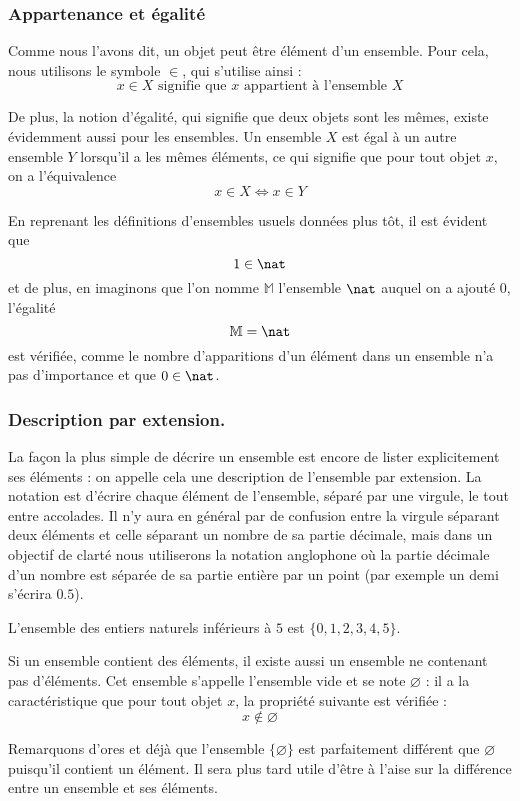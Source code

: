 \subsubsection{Appartenance et égalité}

Comme nous l'avons dit, un objet peut être élément d'un ensemble. Pour cela, nous utilisons le symbole $\in$, qui s'utilise ainsi :
$$x\in X \text{ signifie que } x \text{ appartient à l'ensemble } X
$$

De plus, la notion d'égalité, qui signifie que deux objets sont les mêmes, existe évidemment aussi pour les ensembles. Un ensemble $X$ est égal à un autre ensemble $Y$ lorsqu'il a les mêmes éléments, ce qui signifie que pour tout objet $x$, on a l'équivalence $$x\in X \iff x\in Y$$

\begin{expl}
    En reprenant les définitions d'ensembles usuels données plus tôt, il est évident que $$1\in\nat$$ et de plus, en imaginons que l'on nomme $\mathbb M$ l'ensemble $\nat$ auquel on a ajouté $0$, l'égalité $$\mathbb M = \nat$$ est vérifiée, comme le nombre d'apparitions d'un élément dans un ensemble n'a pas d'importance et que $0\in \nat$.
\end{expl}

\subsubsection{Description par extension.}

La façon la plus simple de décrire un ensemble est encore de lister explicitement ses éléments : on appelle cela une description de l'ensemble par extension. La notation est d'écrire chaque élément de l'ensemble, séparé par une virgule, le tout entre accolades. Il n'y aura en général par de confusion entre la virgule séparant deux éléments et celle séparant un nombre de sa partie décimale, mais dans un objectif de clarté nous utiliserons la notation anglophone où la partie décimale d'un nombre est séparée de sa partie entière par un point (par exemple \og un demi\fg{} s'écrira $0.5$).

\begin{expl}
    L'ensemble des entiers naturels inférieurs à $5$ est $\{0,1,2,3,4,5\}$.
\end{expl}

\begin{rmk}
    Si un ensemble contient des éléments, il existe aussi un ensemble ne contenant pas d'éléments. Cet ensemble s'appelle l'ensemble vide et se note $\varnothing$ : il a la caractéristique que pour tout objet $x$, la propriété suivante est vérifiée : $$x\notin \varnothing$$
    
    Remarquons d'ores et déjà que l'ensemble $\{\varnothing\}$ est parfaitement différent que $\varnothing$ puisqu'il contient un élément. Il sera plus tard utile d'être à l'aise sur la différence entre un ensemble et ses éléments.
\end{rmk}

